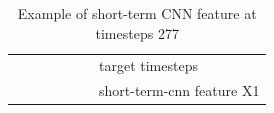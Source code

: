 \begin{table}[]
\begin{tabular}{llllllllllll}
                                                      &                                                  &                                                  &                                                &                                                  & \cellcolor[HTML]{34FF34}                         & \multicolumn{6}{l}{target timesteps}                                                                                                                                                                                                                                                                             \\
                                                      &                                                  &                                                  &                                                &                                                  & \cellcolor[HTML]{FFCC67}                         & \multicolumn{6}{l}{short-term-cnn feature X1}                                                                                                                                                                                                                                                                  
    \end{tabular}
    \caption{Example of short-term CNN feature at timesteps 277}
    \label{tab:Example-short-term-CNN-feature}
    \end{table}

